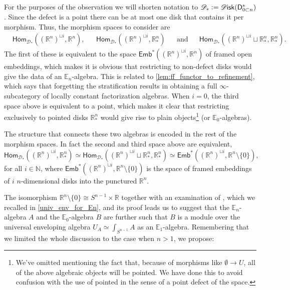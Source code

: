 \documentclass[../text]{subfiles}
\begin{document}
\begin{observation}
    For the purposes of the observation we will shorten notation to $\mathscr{D}_* := \disk (\mathsf{D}_{0 \subset n}^*)$. Since the defect is a point there can be at most one disk that contains it per morphism. Thus, the morphism spaces to consider are
    \begin{align}
        &\mathsf{Hom}_{\mathscr{D}_*} ((\mathbb{R}^n)^{\sqcup i}, \mathbb{R}^n),& &\mathsf{Hom}_{\mathscr{D}_*} ((\mathbb{R}^n)^{\sqcup i}, \mathbb{R}^n_*)& &\mathrm{and}& &\mathsf{Hom}_{\mathscr{D}_*} ((\mathbb{R}^n)^{\sqcup i} \sqcup \mathbb{R}^n_*, \mathbb{R}^n_*).&
    \end{align}
    The first of these is equivalent to the space $\mathsf{Emb}^*((\mathbb{R}^n)^{\sqcup i}, \mathbb{R}^n)$ of framed open embeddings, which makes it is obvious that restricting to non-defect disks would give the data of an $\mathbb{E}_n$-algebra. This is related to \cref{lem:ff_functor_to_refinement}, which says that forgetting the stratification results in obtaining a full $\infty$-subcategory of locally constant factorization algebras. When $i=0$, the third space above is equivalent to a point, which makes it clear that restricting exclusively to pointed disks $\mathbb{R}^n_*$ would give rise to plain objects\footnote{We've omitted mentioning the fact that, because of morphisms like $\emptyset \xrightarrow{} U$, all of the above algebraic objects will be pointed. We have done this to avoid confusion with the use of pointed in the sense of a point defect of the space.} (or $\mathbb{E}_0$-algebras). 
    
    The structure that connects these two algebras is encoded in the rest of the morphism spaces. In fact the second and third space above are equivalent,
    \begin{equation}
        \mathsf{Hom}_{\mathscr{D}_*} ((\mathbb{R}^n)^{\sqcup i}, \mathbb{R}^n_*) \simeq \mathsf{Hom}_{\mathscr{D}_*} ((\mathbb{R}^n)^{\sqcup i} \sqcup \mathbb{R}^n_*, \mathbb{R}^n_*) \simeq \mathsf{Emb}^* ((\mathbb{R}^n)^{\sqcup i}, \mathbb{R}^n \setminus \{0\}),
    \end{equation}
    for all $i \in \mathbb{N}$, where $\mathsf{Emb}^* ((\mathbb{R}^n)^{\sqcup i}, \mathbb{R}^n \setminus \{0\})$ is the space of framed embeddings of $i$ $n$-dimensional disks into the punctured $\mathbb{R}^n$.

    The isomorphism $\mathbb{R}^n \setminus \{ 0 \} \cong S^{n-1} \times \mathbb{R}$ together with an examination of \cite[prop.3.16]{francis2013}, which we recalled in \cref{univ_env_for_En}, and its proof leads us to suggest that the $\mathbb{E}_n$-algebra $A$ and the $\mathbb{E}_0$-algebra $B$ are further such that $B$ is a module over the universal enveloping algebra $U_A \simeq \int_{S^{n-1}} A$ as an $\mathbb{E}_1$-algebra. Remembering that we limited the whole discussion to the case when $n>1$, we propose:
\end{observation}
\end{document}

